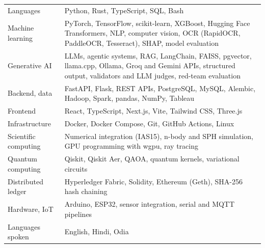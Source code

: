 
\vspace{2pt}
\begin{tabularx}{\textwidth}{LX}
Languages & Python, Rust, TypeScript, SQL, Bash \\
Machine learning & PyTorch, TensorFlow, scikit-learn, XGBoost, Hugging Face Transformers, NLP, computer vision, OCR (RapidOCR, PaddleOCR, Tesseract), SHAP, model evaluation \\
Generative AI & LLMs, agentic systems, RAG, LangChain, FAISS, pgvector, llama.cpp, Ollama, Groq and Gemini APIs, structured output, validators and LLM judges, red-team evaluation \\
Backend, data & FastAPI, Flask, REST APIs, PostgreSQL, MySQL, Alembic, Hadoop, Spark, pandas, NumPy, Tableau \\
Frontend & React, TypeScript, Next.js, Vite, Tailwind CSS, Three.js \\
Infrastructure & Docker, Docker Compose, Git, GitHub Actions, Linux \\
Scientific computing & Numerical integration (IAS15), n-body and SPH simulation, GPU programming with wgpu, ray tracing \\
Quantum computing & Qiskit, Qiskit Aer, QAOA, quantum kernels, variational circuits \\
Distributed ledger & Hyperledger Fabric, Solidity, Ethereum (Geth), SHA-256 hash chaining \\
Hardware, IoT & Arduino, ESP32, sensor integration, serial and MQTT pipelines \\
Languages spoken & English, Hindi, Odia \\
\end{tabularx}
